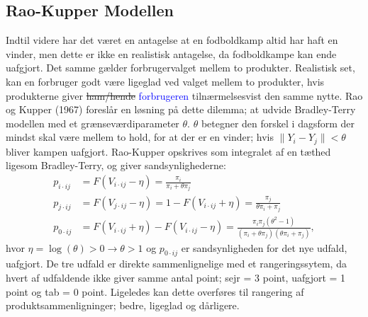 \documentclass[11pt,a4paper]{article}
\begin{document}
\subsection{Rao-Kupper Modellen}
Indtil videre har det været en antagelse at en fodboldkamp altid har haft en vinder, men dette er ikke en realistisk antagelse, da fodboldkampe kan ende uafgjort. Det samme gælder forbrugervalget mellem to produkter. Realistisk set, kan en forbruger godt være ligeglad ved valget mellem to produkter, hvis produkterne giver \sout{ham/hende} \textcolor{blue}{forbrugeren} tilnærmelsesvist den samme nytte. Rao og Kupper (1967) \cite{RaoKupper} foreslår en løsning på dette dilemma; at udvide Bradley-Terry modellen med et grænseværdiparameter $\theta$. $\theta$ betegner den forskel i dagsform der mindst skal være mellem to hold, for at der er en vinder; hvis $\|Y_i-Y_j\| < \theta$ bliver kampen uafgjort. Rao-Kupper opskrives som integralet af en tæthed ligesom Bradley-Terry, og giver sandsynlighederne:
\begin{equation}
\begin{split}
    p_{i\cdot ij}&=F(V_{i\cdot ij}-\eta)=\frac{\pi_i}{\pi_i+\theta \pi_j}\\
    p_{j\cdot ij}&=F(V_{j\cdot ij}-\eta)=1-F(V_{i\cdot ij}+\eta)=\frac{\pi_j}{\theta \pi_i+\pi_j}\\
    p_{0\cdot ij}&=F(V_{i\cdot ij}+\eta)-F(V_{i\cdot ij}-\eta)= \frac{\pi_i \pi_j(\theta^2 -1)}{(\pi_i+\theta \pi_j)(\theta \pi_i + \pi_j)} \label{Sandynligheder},
\end{split}
\end{equation}
hvor $\eta=\log(\theta)>0 \rightarrow\theta>1$ og $p_{0\cdot ij}$ er sandsynligheden for det nye udfald, uafgjort. De tre udfald er direkte sammenlignelige med et rangeringssytem, da hvert af udfaldende ikke giver samme antal point; sejr = 3 point, uafgjort = 1 point og tab = 0 point. Ligeledes kan dette overføres til rangering af produktsammenligninger; bedre, ligeglad og dårligere. 
\end{document}
